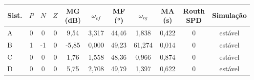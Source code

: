 \begin{tabular}{lcccccccccc}
\hline
Sist. & $P$ & $N$ & $Z$ & MG (dB) & $\omega_{cf}$ & MF (°) & $\omega_{cg}$ & MA (s) & Routh SPD & Simulação \\
\hline
A & 0 & 0 & 0 & 9{,}54 & 3{,}317 & 44{,}46 & 1{,}838 & 0{,}422 & 0 & estável \\
B & 1 & -1 & 0 & -5{,}85 & 0{,}000 & 49{,}23 & 61{,}274 & 0{,}014 & 0 & estável \\
C & 0 & 0 & 0 & 1{,}76 & 1{,}558 & 48{,}36 & 0{,}966 & 0{,}874 & 0 & estável \\
D & 0 & 0 & 0 & 5{,}75 & 2{,}708 & 49{,}79 & 1{,}397 & 0{,}622 & 0 & estável \\
\hline
\end{tabular}
